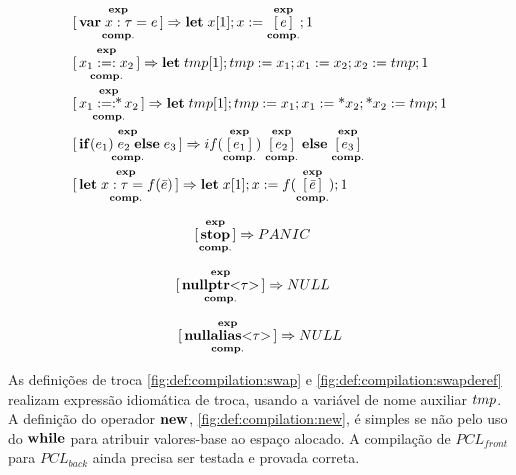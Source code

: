 \begin{figure}[ht]
\begin{align}
		&\compe{\KW{var}\; x: \tau = e} \Rightarrow \KW{let}\;x[1]; x := \compe{e}; 1 \\
		&\compe{x_1 :=: x_2} \Rightarrow \KW{let}\;\TMP[1]; \TMP := x_1; x_1 := x_2; x_2 := \TMP; 1 \label{fig:def:compilation:swap}\\
		&\compe{x_1 :=:\!\!\text{*}\,x_2} \Rightarrow \KW{let}\;\TMP[1]; \TMP := x_1; x_1 := \text{*}x_2; \text{*}x_2 := \TMP; 1 \label{fig:def:compilation:swapderef}\\
		&\compe{\KW{if}(e_1)\;e_2\;\KW{else}\;e_3} \Rightarrow if(\compe{e_1})\;\compe{e_2}\;\KW{else}\;\compe{e_3}\\
		&\compe{\KW{let}\; x: \tau = f(\bar e)} \Rightarrow \KW{let}\;x[1]; x := f(\compe{\bar e}); 1 
	\end{align}
	\begin{minipage}{.25\linewidth}
		\begin{align}
			&\overset{\mathbf{exp}}{\underset{\mathbf{comp.}}{[\,\mathbf{stop}\,]}} \Rightarrow PANIC
		\end{align}
	\end{minipage}
	\hspace{0.02\linewidth}
	\begin{minipage}{.30\linewidth}
		\begin{align}
			&\overset{\mathbf{exp}}{\underset{\mathbf{comp.}}{[\,\mathbf{nullptr}\text{<}\tau\text{>}\,]}} \Rightarrow NULL 
		\end{align}
	\end{minipage}
	\hspace{0.02\linewidth}
	\begin{minipage}{.33\linewidth}
		\begin{align}
			\overset{\mathbf{exp}}{\underset{\mathbf{comp.}}{[\,\mathbf{nullalias}\text{<}\tau\text{>}\,]}} \Rightarrow NULL 
		\end{align}
	\end{minipage}
\end{figure}

As definições de troca \ref{fig:def:compilation:swap} e \ref{fig:def:compilation:swapderef} realizam expressão idiomática de troca, usando a variável de nome auxiliar $\TMP$. A definição do operador $\mathbf{new}$, \ref{fig:def:compilation:new}, é simples se não pelo uso do  $\mathbf{while}$ para atribuir valores-base ao espaço alocado. A compilação de $PCL_{front}$ para $PCL_{back}$ ainda precisa ser testada e provada correta.
